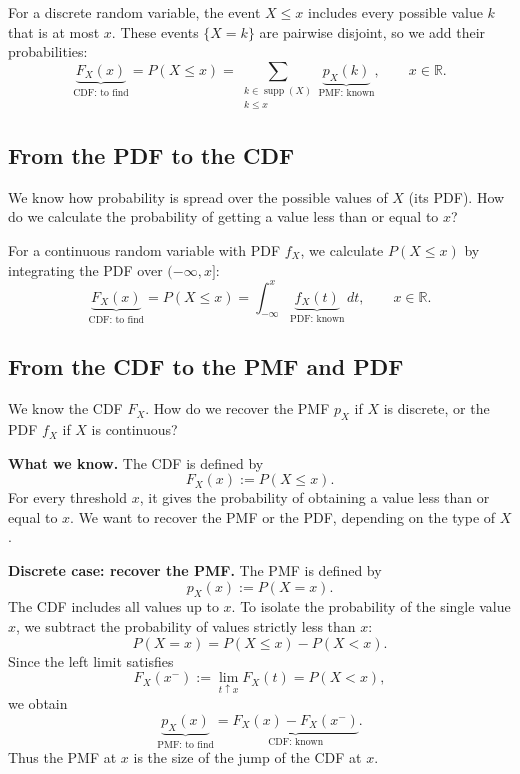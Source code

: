 \documentclass[12pt,a4paper,oneside]{report}
\begin{document}
For a discrete random variable, the event $X\leq x$ includes every
possible value $k$ that is at most $x$. These events $\{X=k\}$ are
pairwise disjoint, so we add their probabilities:
\[
  \boxed{\underbrace{F_X(x)}_{\text{CDF: to find}}=P(X\leq x)
    =\sum_{\substack{k\in\operatorname{supp}(X)\\k\leq x}}
      \underbrace{p_X(k)}_{\text{PMF: known}},
    \qquad x\in\mathbb R.}
\]
\subsection*{From the PDF to the CDF}
\label{rel:pdf-to-cdf}
\begin{tcolorbox}[colback=blue!3,colframe=blue!30!black,
  boxrule=0.4pt,arc=1mm,title={What we are trying to answer},
  colbacktitle=blue!10,coltitle=black,fonttitle=\bfseries]
We know how probability is spread over the possible values of $X$
(its PDF). How do we calculate the probability of getting a value
less than or equal to $x$?
\end{tcolorbox}
For a continuous random variable with PDF $f_X$, we calculate
$P(X\leq x)$ by integrating the PDF over $(-\infty,x]$:
\[
  \boxed{\underbrace{F_X(x)}_{\text{CDF: to find}}=P(X\leq x)
    =\int_{-\infty}^{x}\underbrace{f_X(t)}_{\text{PDF: known}}\,dt,
    \qquad x\in\mathbb R.}
\]
\clearpage
\subsection*{From the CDF to the PMF and PDF}
\begin{tcolorbox}[colback=blue!3,colframe=blue!30!black,
  boxrule=0.4pt,arc=1mm,title={What we are trying to answer},
  colbacktitle=blue!10,coltitle=black,fonttitle=\bfseries]
We know the CDF $F_X$. How do we recover the PMF $p_X$ if $X$ is
discrete, or the PDF $f_X$ if $X$ is continuous?
\end{tcolorbox}

\textbf{What we know.} The CDF is defined by
\[
  F_X(x):=P(X\leq x).
\]
For every threshold $x$, it gives the probability of obtaining a
value less than or equal to $x$. We want to recover the PMF or the
PDF, depending on the type of $X$.

\textbf{Discrete case: recover the PMF.}
The PMF is defined by
\[
  p_X(x):=P(X=x).
\]
The CDF includes all values up to $x$. To isolate the probability
of the single value $x$, we subtract the probability of values
strictly less than $x$:
\[
  P(X=x)=P(X\leq x)-P(X<x).
\]
Since the left limit satisfies
\[
  F_X(x^-):=\lim_{t\uparrow x}F_X(t)=P(X<x),
\]
we obtain
\[
  \boxed{\underbrace{p_X(x)}_{\text{PMF: to find}}
    =\underbrace{F_X(x)-F_X(x^-)}_{\text{CDF: known}}.}
\]
Thus the PMF at $x$ is the size of the jump of the CDF at $x$.
\end{document}
